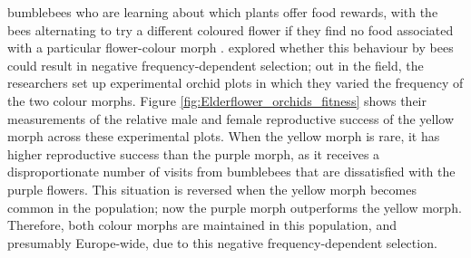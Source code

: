 bumblebees who are learning about which plants offer food rewards,
with the bees alternating to try a different coloured flower if they
find no food associated with a particular flower-colour morph \citep{smithson1997negative}. 
\citet{gigord2001negative} explored whether this behaviour by bees
could result in negative frequency-dependent selection; out in the field, the researchers set up
experimental orchid plots in which they varied
the frequency of the two colour morphs. Figure \ref{fig:Elderflower_orchids_fitness} shows their measurements of the relative
male and female reproductive success of the yellow morph across these experimental plots. When the yellow morph is rare, it has
higher reproductive success than the purple morph, as it receives a
disproportionate number of visits from bumblebees that are dissatisfied
with the purple flowers. This situation is reversed when the yellow
morph becomes common in the population; now the purple morph
outperforms the yellow morph. Therefore, both colour morphs are
maintained in this population, and presumably Europe-wide, due to this negative frequency-dependent
selection. %

